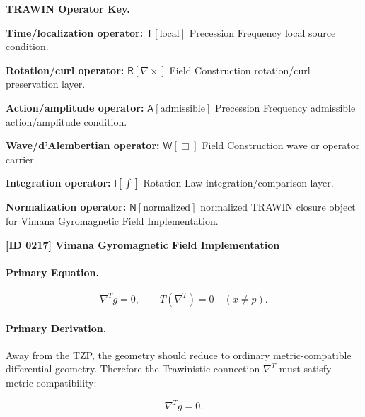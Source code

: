 \par\vspace{0.45\baselineskip}
\noindent\begin{minipage}[t]{\linewidth}
\begingroup
\small
\raggedright
\textbf{TRAWIN Operator Key.}\par
\noindent\textbf{Time/localization operator:} $\mathsf{T}\!\left[\mathrm{local}\right]$ Precession Frequency local source condition.\par
\noindent\textbf{Rotation/curl operator:} $\mathsf{R}\!\left[\nabla\times\right]$ Field Construction rotation/curl preservation layer.\par
\noindent\textbf{Action/amplitude operator:} $\mathsf{A}\!\left[\mathrm{admissible}\right]$ Precession Frequency admissible action/amplitude condition.\par
\noindent\textbf{Wave/d'Alembertian operator:} $\mathsf{W}\!\left[\Box\right]$ Field Construction wave or operator carrier.\par
\noindent\textbf{Integration operator:} $\mathsf{I}\!\left[\int\right]$ Rotation Law integration/comparison layer.\par
\noindent\textbf{Normalization operator:} $\mathsf{N}\!\left[\mathrm{normalized}\right]$ normalized TRAWIN closure object for Vimana Gyromagnetic Field Implementation.\par
\endgroup
\end{minipage}

\clearpage
\noindent\textbf{[ID 0217] Vimana Gyromagnetic Field Implementation}\par
\vspace{0.35em}
\paragraph{Primary Equation.}
\begin{equation}
\nabla^{T}g=0,
\qquad
T(\nabla^{T})=0
\quad
(x\neq p).
\end{equation}

\paragraph{Primary Derivation.}
Away from the TZP, the geometry should reduce to ordinary metric-compatible differential geometry. Therefore the Trawinistic connection $\nabla^{T}$ must satisfy metric compatibility:

\begin{equation}
\nabla^{T}g=0 .
\end{equation}

